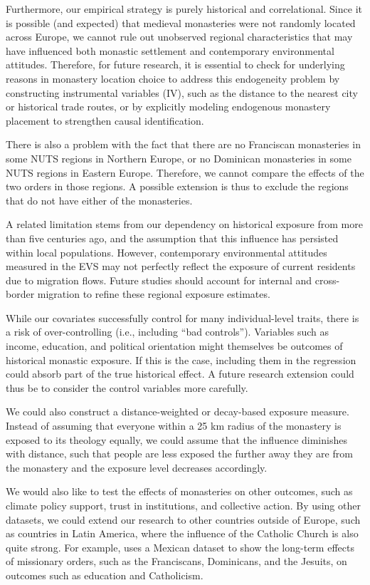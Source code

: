 \documentclass[12pt, a4paper]{article}
\begin{document}
Furthermore, our empirical strategy is purely historical and correlational. Since it is
possible (and expected) that medieval monasteries were not randomly located across Europe,
we cannot rule out unobserved regional characteristics that may have influenced both monastic settlement and 
contemporary environmental attitudes. Therefore, for future research, it is essential to check for underlying 
reasons in monastery location choice to address this endogeneity problem by constructing instrumental variables (IV), 
such as the distance to the nearest city or historical trade routes, or by explicitly modeling endogenous 
monastery placement to strengthen causal identification.

There is also a problem with the fact that there are no Franciscan monasteries in some NUTS regions in Northern Europe, 
or no Dominican monasteries in some NUTS regions in Eastern Europe. Therefore, we cannot compare the effects of the two 
orders in those regions. A possible extension is thus to exclude the regions that do not have either of the monasteries. 

A related limitation stems from our dependency on historical exposure from more than five centuries ago, and the assumption that
this influence has persisted within local populations. However, contemporary environmental attitudes measured in the EVS may not perfectly reflect the 
exposure of current residents due to migration flows. Future studies should account for internal and cross-border migration to refine these regional exposure estimates.

While our covariates successfully control for many individual-level traits, there is a risk of over-controlling (i.e., including ``bad controls''). 
Variables such as income, education, and political orientation might themselves be outcomes of historical monastic exposure. 
If this is the case, including them in the regression could absorb part of the true historical effect. 
A future research extension could thus be to consider the control variables more carefully. 

We could also construct a distance-weighted or decay-based exposure measure. Instead of assuming that everyone within 
a 25 km radius of the monastery is exposed to its theology equally, we could assume that the influence 
diminishes with distance, such that people are less exposed the further away they are from the monastery and the exposure level decreases accordingly. 

We would also like to test the effects of monasteries on other outcomes, such as climate policy support, 
trust in institutions, and collective action. By using other datasets, we could extend our research to other 
countries outside of Europe, such as countries in Latin America, where the influence of the Catholic Church is also quite strong.
For example, \textcite{waldinger2017} uses a Mexican dataset to show the long-term effects of missionary orders, 
such as the Franciscans, Dominicans, and the Jesuits, on outcomes such as education and Catholicism.
\end{document}
